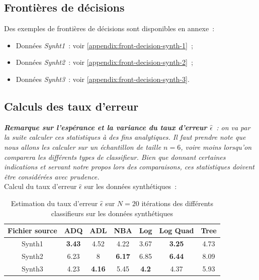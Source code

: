 \documentclass[a4paper,10pt]{report}
\begin{document}
\subsection{Frontières de décisions}

Des exemples de frontières de décisions sont disponibles en annexe~:
\begin{itemize}
	\item Données \textit{Synht1}~: voir \autoref{appendix:front-decision-synth-1}~;
	\item Données \textit{Synht2}~: voir \autoref{appendix:front-decision-synth-2}~;
	\item Données \textit{Synht3}~: voir \autoref{appendix:front-decision-synth-3}.
\end{itemize}



\subsection{Calculs des taux d'erreur}

\textit{\textbf{Remarque sur l'espérance et la variance du taux d'erreur $\hat{\epsilon}$}~: on va par la suite calculer ces statistiques à des fins analytiques. Il faut prendre note que nous allons les calculer sur un échantillon de taille $n=6$, voire moins lorsqu'on comparera les différents types de classifieur. Bien que donnant certaines indications et servant notre propos lors des comparaisons, ces statistiques doivent être considérées avec prudence.}\\

Calcul du taux d'erreur $\hat{\epsilon}$ sur les données synthétiques~:
\begin{table}[H]
	\centering
	\captionsetup{justification=centering, margin=4cm}
	\begin{tabular}{c|c|c|c|c|c|c}
		Fichier source & ADQ & ADL & NBA & Log & Log Quad & Tree \\ 
		\hline
		Synth1 & \textbf{3.43} & 4.52 & 4.22 & 3.67 & \textbf{3.25} & 4.73  \\ 
		Synth2 & 6.23 & 8 & \textbf{6.17} & 6.85 & \textbf{6.44} & 8.09  \\ 
		Synth3 & 4.23 & \textbf{4.16} & 5.45 & \textbf{4.2} & 4.37 & 5.93  \\ 
	\end{tabular}
	\caption{\small Estimation du taux d'erreur $\hat{\epsilon}$ sur $N=20$ itérations des différents classifieurs sur les données synthétiques}
	\label{table:2-1-erreur-data-synth}
\end{table}
\end{document}
